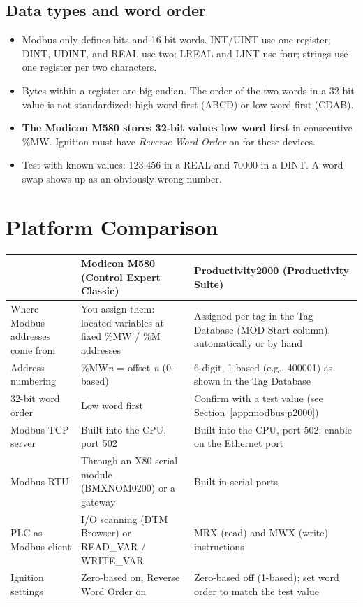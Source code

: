 \subsection*{Data types and word order}
\begin{itemize}[itemsep=2pt]
  \item Modbus only defines bits and 16-bit words. INT/UINT use one register; DINT, UDINT, and REAL use two; LREAL and LINT use four; strings use one register per two characters.
  \item Bytes within a register are big-endian. The order of the two words in a 32-bit value is not standardized: high word first (ABCD) or low word first (CDAB).
  \item \textbf{The Modicon M580 stores 32-bit values low word first} in consecutive \%MW. Ignition must have \emph{Reverse Word Order} on for these devices.
  \item Test with known values: 123.456 in a REAL and 70000 in a DINT. A word swap shows up as an obviously wrong number.
\end{itemize}

\section{Platform Comparison}
\begin{longtable}{@{}P{3.90cm}P{6.50cm}P{6.50cm}@{}}
\toprule
& \textbf{Modicon M580 (Control Expert Classic)} & \textbf{Productivity2000 (Productivity Suite)} \\
\midrule
\endhead
Where Modbus addresses come from & You assign them: located variables at fixed \%MW / \%M addresses & Assigned per tag in the Tag Database (MOD Start column), automatically or by hand \\
Address numbering & \%MW\textit{n} = offset \textit{n} (0-based) & 6-digit, 1-based (e.g., 400001) as shown in the Tag Database \\
32-bit word order & Low word first & Confirm with a test value (see Section~\ref{app:modbus:p2000}) \\
Modbus TCP server & Built into the CPU, port 502 & Built into the CPU, port 502; enable on the Ethernet port \\
Modbus RTU & Through an X80 serial module (BMXNOM0200) or a gateway & Built-in serial ports \\
PLC as Modbus client & I/O scanning (DTM Browser) or READ\_VAR / WRITE\_VAR & MRX (read) and MWX (write) instructions \\
Ignition settings & Zero-based on, Reverse Word Order on & Zero-based off (1-based); set word order to match the test value \\
\bottomrule
\end{longtable}

